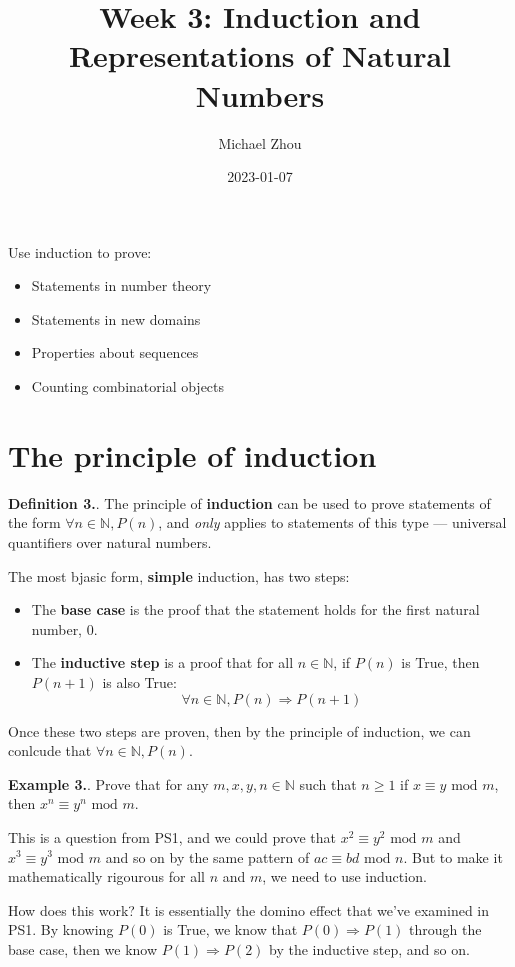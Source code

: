 \documentclass{article}
\title{Week 3: Induction and Representations of Natural Numbers}
\author{Michael Zhou}
\date{2023-01-07}
\newcounter{defcount}
\newcounter{excount}
\newcommand\df{\stepcounter{defcount} \textbf{Definition 3.\thedefcount}. }
\newcommand\ex{\stepcounter{excount} \textbf{Example 3.\theexcount}. }
\begin{document}
\maketitle
Use induction to prove:
\begin{itemize}
    \item Statements in number theory 
    \item Statements in new domains 
    \item Properties about sequences 
    \item Counting combinatorial objects
\end{itemize}

\section{The principle of induction}
\df The principle of \textbf{induction} can be used to prove statements 
of the form $\forall n \in \mathbb{N}, P(n)$, and \textit{only} applies to 
statements of this type --- universal quantifiers over natural numbers. 

The most bjasic form, \textbf{simple} induction, has two steps:
\begin{itemize}
    \item The \textbf{base case} is the proof that the statement holds for the 
        first natural number, 0. 
    \item The \textbf{inductive step} is a proof that for all $n \in \mathbb{N}$, 
        if $P(n)$ is True, then $P(n+1)$ is also True: 
        $$\forall n \in \mathbb{N}, P(n) \Rightarrow P(n+1)$$
\end{itemize}
Once these two steps are proven, then by the principle of induction, we can 
conlcude that $\forall n \in \mathbb{N}, P(n)$.

\ex Prove that for any $m, x, y, n \in \mathbb{N}$ such that $n \geq 1$ if 
$x \equiv y \text{ mod } m$, then $x^n \equiv y^n \text{ mod } m$.

This is a question from PS1, and we could prove that $x^2 \equiv y^2 \text{ mod } m$ 
and $x^3 \equiv y^3 \text{ mod } m$ and so on by the same pattern of 
$ac \equiv bd \text{ mod } n$. But to make it mathematically rigourous for 
all $n$ and $m$, we need to use induction.

How does this work? It is essentially the domino effect that we've examined 
in PS1. By knowing $P(0)$ is True, we know that $P(0) \Rightarrow P(1)$ through 
the base case, then we know $P(1) \Rightarrow P(2)$ by the inductive step, 
and so on. 
\end{document}
